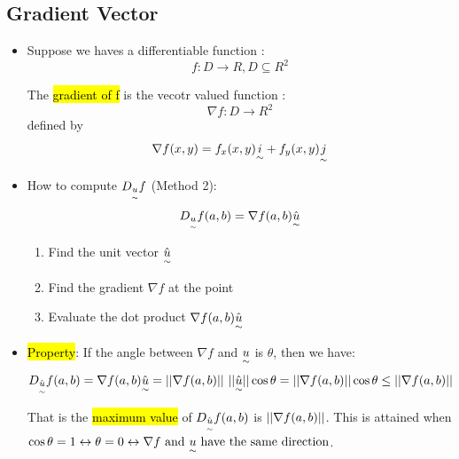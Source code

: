 \documentclass{article}
\begin{document}
  \subsection*{Gradient Vector}
  \begin{itemize}
  	\item \DEF Suppose we haves a differentiable function :
  	$$
  	 f: D \rightarrow R, D \subseteq R^2
  	$$

  	The \hl{gradient of f} is the vecotr valued function :
  	$$
  		\nabla f : D \rightarrow R^2
  	$$
  	defined by
  	$$
  		\nabla f(x,y) = f_x(x,y)\underset{\sim}{i} + f_y(x,y)\underset{\sim}{j}
  	$$

  	\item How to compute $D_{\underset{\sim}{u}}f$ (Method 2):
  	$$
  		D_{\underset{\sim}{u}} f(a,b) = \nabla f(a,b) \hat{\underset{\sim}{u}}
  	$$
	  	\begin{enumerate}
	  		\item Find the unit vector $\hat{\underset{\sim}{u}}$
	  		\item Find the gradient $\nabla f$ at the point
	  		\item Evaluate the dot product $\nabla f(a,b) \hat{\underset{\sim}{u}}$
	  	\end{enumerate}

	\item \hl{Property}:
		If the angle between $\nabla f$ and $\underset{\sim}{u}$ is $\theta$, then we have:
		$$
			D_{\hat{\underset{\sim}{u}}}f(a,b) = \nabla f(a,b) \hat{\underset{\sim}{u}} = ||\nabla f(a,b)||\ ||\hat{\underset{\sim}{u}}|| \cos{\theta} =  ||\nabla f(a,b)||\cos{\theta} \leq ||\nabla f(a,b)||
		$$

		That is the \hl{maximum value} of $D_{\hat{\underset{\sim}{u}}}f(a,b)$ is $||\nabla f(a,b)||$. This is attained when $\cos{\theta} = 1 \leftrightarrow \theta = 0 \leftrightarrow \nabla f \text{ and } \underset{\sim}{u} \text{ have the same direction}$.
  \end{itemize}
\end{document}
